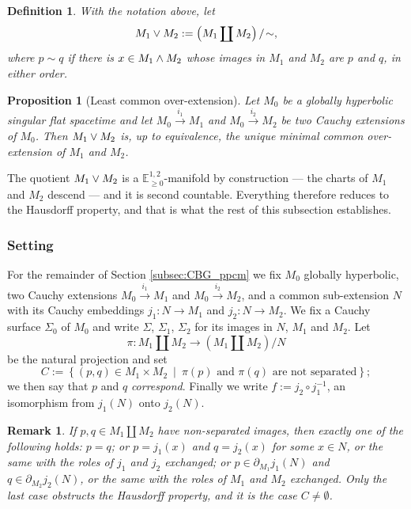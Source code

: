 \documentclass[a4paper,twoside]{article}
\newcommand{\mass}[1]{\mathbb{E}^{1,2}_{#1}}
\newtheorem{prop}[lem]{Proposition}
\newtheorem{defi}[lem]{Definition}
\newtheorem{rem}[lem]{Remark}
\begin{document}
\begin{defi}\label{defi:ppcm}
With the notation above, let
$$M_1 \vee M_2 := \left(M_1\coprod M_2\right)/\!\sim,$$
where $p\sim q$ if there is $x\in M_1 \wedge M_2$ whose images in $M_1$ and $M_2$ are $p$ and $q$, in either
order.
\end{defi}

\begin{prop}[Least common over-extension]\label{prop:ppcm_Cauchy}
Let $M_0$ be a globally hyperbolic singular flat spacetime and let $M_0\xrightarrow{i_1} M_1$ and
$M_0\xrightarrow{i_2} M_2$ be two Cauchy extensions of $M_0$. Then $M_1 \vee M_2$ is, up to equivalence,
the unique minimal common over-extension of $M_1$ and $M_2$.
\end{prop}

The quotient $M_1 \vee M_2$ is a $\mass{\geq0}$-manifold by construction --- the charts of $M_1$ and $M_2$
descend --- and it is second countable. Everything therefore reduces to the Hausdorff property, and
that is what the rest of this subsection establishes.

\subsubsection*{Setting}
For the remainder of Section \ref{subsec:CBG_ppcm} we fix $M_0$ globally hyperbolic, two Cauchy
extensions $M_0\xrightarrow{i_1}M_1$ and $M_0\xrightarrow{i_2}M_2$, and a common sub-extension $N$
with its Cauchy embeddings $j_1:N\rightarrow M_1$ and $j_2:N\rightarrow M_2$. We fix a Cauchy
surface $\Sigma_0$ of $M_0$ and write $\Sigma$, $\Sigma_1$, $\Sigma_2$ for its images in $N$, $M_1$
and $M_2$. Let
$$\pi:M_1\coprod M_2\longrightarrow \left(M_1\coprod M_2\right)/N$$
be the natural projection and set
$$C:=\left\{(p,q)\in M_1\times M_2 ~\middle|~ \pi(p)\text{ and }\pi(q)\text{ are not separated}\right\};$$
we then say that $p$ and $q$ \emph{correspond}. Finally we write $f:=j_2\circ j_1^{-1}$, an
isomorphism from $j_1(N)$ onto $j_2(N)$.

\begin{rem}\label{rem:non_separe_cas}
If $p,q\in M_1\coprod M_2$ have non-separated images, then exactly one of the following holds:
$p=q$; or $p=j_1(x)$ and $q=j_2(x)$ for some $x\in N$, or the same with the roles of $j_1$ and $j_2$
exchanged; or $p\in \partial_{M_1}j_1(N)$ and $q\in \partial_{M_2}j_2(N)$, or the same with the
roles of $M_1$ and $M_2$ exchanged. Only the last case obstructs the Hausdorff property, and it is
the case $C\neq \emptyset$.
\end{rem}
\end{document}
